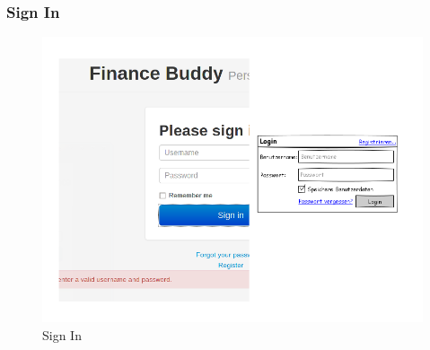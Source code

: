\documentclass[a4paper,10pt]{article}
\begin{document}

\clearpage
\subsubsection{Sign In}

\begin{figure}
\centering
\includegraphics[width=\textwidth]{sign-in}
\caption{Sign In} \label{fig:sign-in}
\end{figure}
\end{document}
